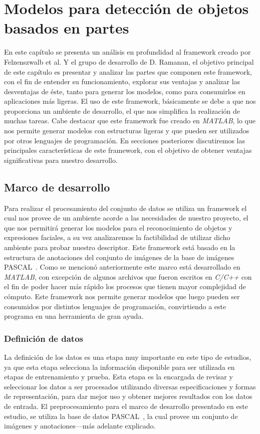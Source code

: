 \chapter[Modelos basados en partes ]{Modelos para detección de objetos basados en partes }\label{ch:capitulo4}
En este capítulo se presenta un análisis en profundidad al framework creado por Felzenszwalb et al. Y el grupo de desarrollo de D. Ramanan, el objetivo principal de este capítulo es presentar y analizar las partes que componen este framework, con el fin de entender su funcionamiento, explorar sus ventajas y analizar las desventajas de éste, tanto para generar los modelos, como para consumirlos en aplicaciones más ligeras. El uso de este framework, básicamente se debe a que nos proporciona un ambiente de desarrollo, el que nos simplifica la realización de muchas tareas. Cabe destacar que este framework fue creado en \textit{MATLAB}, lo que nos permite generar modelos con estructuras ligeras y que pueden ser utilizados por otros lenguajes de programación. En secciones posteriores discutiremos las principales características de este framework, con el objetivo de obtener ventajas significativas para nuestro desarrollo.

\section{Marco de desarrollo}\label{sec:framework}
Para realizar el procesamiento del conjunto de datos se utiliza un framework el cual nos provee de un ambiente acorde a las necesidades de nuestro proyecto, el que nos permitirá generar los modelos para el reconocimiento de objetos y expresiones faciales, a su vez analizaremos la factibilidad de utilizar dicho ambiente para probar nuestro descriptor. Este framework está basado en la estructura de anotaciones del conjunto de imágenes de la base de imágenes PASCAL~\cite{Everingham2010}. Como se mencionó anteriormente este marco está desarrollado en \textit{MATLAB}, con excepción de algunos archivos que fueron escritos en \textit{C/C++} con el fin de poder hacer más rápido los procesos que tienen mayor complejidad de cómputo. Este framework nos permite generar modelos que luego pueden ser consumidos por distintos lenguajes de programación, convirtiendo a este programa en una herramienta de gran ayuda.

\subsection{Definición de datos}\label{sec:datos}
La definición de los datos es una etapa muy importante en este tipo de estudios, ya que esta etapa selecciona la información disponible para ser utilizada en etapas de entrenamiento y prueba. Esta etapa es la encargada de revisar y seleccionar los datos a ser procesados utilizando diversas especificaciones y formas de representación, para dar mejor uso y obtener mejores resultados con los datos de entrada. El preprocesamiento para el marco de desarrollo presentado en este estudio, se utiliza la base de datos PASCAL~\cite{Everingham2010}, la cual provee un conjunto de imágenes y anotaciones---más adelante explicado.

